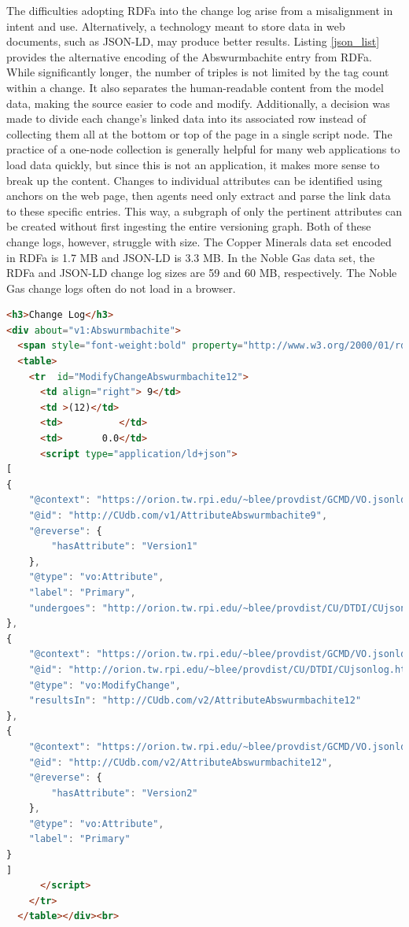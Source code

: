 The difficulties adopting RDFa into the change log arise from a misalignment in intent and use.
Alternatively, a technology meant to store data in web documents, such as JSON-LD, may produce better results.
Listing \ref{json_list} provides the alternative encoding of the Abswurmbachite entry from RDFa.
While significantly longer, the number of triples is not limited by the tag count within a change.
It also separates the human-readable content from the model data, making the source easier to code and modify.
Additionally, a decision was made to divide each change's linked data into its associated row instead of collecting them all at the bottom or top of the page in a single script node.
The practice of a one-node collection is generally helpful for many web applications to load data quickly, but since this is not an application, it makes more sense to break up the content.
Changes to individual attributes can be identified using anchors on the web page, then agents need only extract and parse the link data to these specific entries.
This way, a subgraph of only the pertinent attributes can be created without first ingesting the entire versioning graph.
Both of these change logs, however, struggle with size.
The Copper Minerals data set encoded in RDFa is 1.7 MB and JSON-LD is 3.3 MB.
In the Noble Gas data set, the RDFa and JSON-LD change log sizes are 59 and 60 MB, respectively.
The Noble Gas change logs often do not load in a browser.

\begin{lstlisting}[language=HTML, caption=Abswurmbachite JSON-LD, label=json_list]
<h3>Change Log</h3>
<div about="v1:Abswurmbachite">
  <span style="font-weight:bold" property="http://www.w3.org/2000/01/rdf-schema#label">Abswurmbachite</span>
  <table>
    <tr  id="ModifyChangeAbswurmbachite12">
      <td align="right"> 9</td>
      <td >(12)</td>
      <td>          </td>
      <td>       0.0</td>
      <script type="application/ld+json">
[
{
	"@context": "https://orion.tw.rpi.edu/~blee/provdist/GCMD/VO.jsonld", 
	"@id": "http://CUdb.com/v1/AttributeAbswurmbachite9", 
	"@reverse": {
		"hasAttribute": "Version1"
	}, 
	"@type": "vo:Attribute", 
	"label": "Primary", 
	"undergoes": "http://orion.tw.rpi.edu/~blee/provdist/CU/DTDI/CUjsonlog.html#ModifyChangeAbswurmbachite12"
}, 
{
	"@context": "https://orion.tw.rpi.edu/~blee/provdist/GCMD/VO.jsonld", 
	"@id": "http://orion.tw.rpi.edu/~blee/provdist/CU/DTDI/CUjsonlog.html#ModifyChangeAbswurmbachite12", 
	"@type": "vo:ModifyChange", 
	"resultsIn": "http://CUdb.com/v2/AttributeAbswurmbachite12"
}, 
{
	"@context": "https://orion.tw.rpi.edu/~blee/provdist/GCMD/VO.jsonld", 
	"@id": "http://CUdb.com/v2/AttributeAbswurmbachite12", 
	"@reverse": {
		"hasAttribute": "Version2"
	}, 
	"@type": "vo:Attribute", 
	"label": "Primary"
}
]
      </script>
    </tr>
  </table></div><br>
\end{lstlisting}

